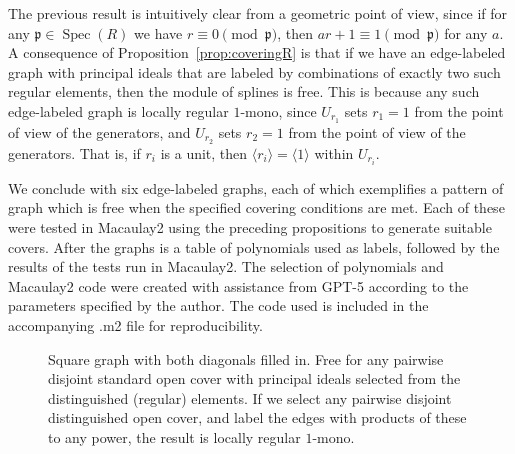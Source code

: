 \documentclass{article}
\DeclareMathOperator{\Spec}{Spec}
\begin{document}
The previous result is intuitively clear from a geometric point of view, since if for any $\mathfrak p \in \Spec(R)$ we have $r \equiv 0 \pmod{\mathfrak p}$, then $ar+1 \equiv 1 \pmod {\mathfrak p}$ for any $a$. A consequence of Proposition~\ref{prop:coveringR} is that if we have an edge-labeled graph with principal ideals that are labeled by combinations of exactly two such regular elements, then the module of splines is free. This is because any such edge-labeled graph is locally regular $1$-mono, since $U_{r_1}$ sets $r_1=1$ from the point of view of the generators, and $U_{r_2}$ sets $r_2=1$ from the point of view of the generators. That is, if $r_i$ is a unit, then $\langle r_i \rangle = \langle 1 \rangle$ within $U_{r_i}$.

We conclude with six edge-labeled graphs, each of which exemplifies a pattern of graph which is free when the specified covering conditions are met. Each of these were tested in Macaulay2 using the preceding propositions to generate suitable covers. After the graphs is a table of polynomials used as labels, followed by the results of the tests run in Macaulay2. The selection of polynomials and Macaulay2 code were created with assistance from GPT-5 according to the parameters specified by the author. The code used is included in the accompanying .m2 file for reproducibility. 




\begin{figure}[ht]
  \centering
  \caption{Square graph with both diagonals filled in. Free for any pairwise disjoint standard open cover with principal ideals selected from the distinguished (regular) elements. If we select any pairwise disjoint distinguished open cover, and label the edges with products of these to any power, the result is locally regular $1$-mono.}
  \label{fig:square-diagonals}
\end{figure}
\end{document}
